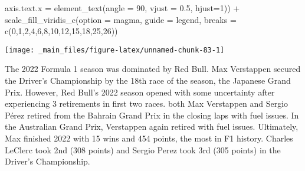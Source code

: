 \documentclass[
]{book}
\newenvironment{Shaded}{\begin{snugshade}}{\end{snugshade}}
\newcommand{\AttributeTok}[1]{\textcolor[rgb]{0.77,0.63,0.00}{#1}}
\newcommand{\DecValTok}[1]{\textcolor[rgb]{0.00,0.00,0.81}{#1}}
\newcommand{\FloatTok}[1]{\textcolor[rgb]{0.00,0.00,0.81}{#1}}
\newcommand{\FunctionTok}[1]{\textcolor[rgb]{0.00,0.00,0.00}{#1}}
\newcommand{\NormalTok}[1]{#1}
\newcommand{\SpecialCharTok}[1]{\textcolor[rgb]{0.00,0.00,0.00}{#1}}
\newcommand{\StringTok}[1]{\textcolor[rgb]{0.31,0.60,0.02}{#1}}
\begin{document}
\begin{Shaded}
\begin{Highlighting}[]
        \AttributeTok{axis.text.x =} \FunctionTok{element\_text}\NormalTok{(}\AttributeTok{angle =} \DecValTok{90}\NormalTok{, }\AttributeTok{vjust =} \FloatTok{0.5}\NormalTok{, }\AttributeTok{hjust=}\DecValTok{1}\NormalTok{)) }\SpecialCharTok{+}
  \FunctionTok{scale\_fill\_viridis\_c}\NormalTok{(}\AttributeTok{option =} \StringTok{\textquotesingle{}magma\textquotesingle{}}\NormalTok{,}
                       \AttributeTok{guide =} \StringTok{\textquotesingle{}legend\textquotesingle{}}\NormalTok{,}
                       \AttributeTok{breaks =} \FunctionTok{c}\NormalTok{(}\DecValTok{0}\NormalTok{,}\DecValTok{1}\NormalTok{,}\DecValTok{2}\NormalTok{,}\DecValTok{4}\NormalTok{,}\DecValTok{6}\NormalTok{,}\DecValTok{8}\NormalTok{,}\DecValTok{10}\NormalTok{,}\DecValTok{12}\NormalTok{,}\DecValTok{15}\NormalTok{,}\DecValTok{18}\NormalTok{,}\DecValTok{25}\NormalTok{,}\DecValTok{26}\NormalTok{))}
\end{Highlighting}
\end{Shaded}

\begin{center}\texttt{[image: \_main\_files/figure-latex/unnamed-chunk-83-1]} \end{center}

The 2022 Formula 1 season was dominated by Red Bull. Max Verstappen secured the Driver's Championship by the 18th race of the season, the Japanese Grand Prix. However, Red Bull's 2022 season opened with some uncertainty after experiencing 3 retirements in first two races. both Max Verstappen and Sergio Pérez retired from the Bahrain Grand Prix in the closing laps with fuel issues. In the Australian Grand Prix, Verstappen again retired with fuel issues. Ultimately, Max finished 2022 with 15 wins and 454 points, the most in F1 history. Charles LeClerc took 2nd (308 points) and Sergio Perez took 3rd (305 points) in the Driver's Championship.
\end{document}
